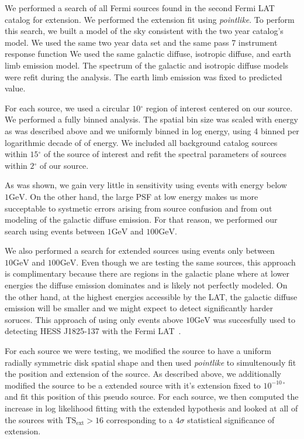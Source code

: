 \documentclass[preprint]{aastex}
\newcommand{\gev}{\text{GeV}\xspace}
\newcommand{\tsext}{\ensuremath{\text{TS}_\text{ext}}\xspace}
\renewcommand{\deg}{\ensuremath{^\circ}\xspace}
\newcommand{\pointlike}{{\em pointlike}\xspace}
\begin{document}
We performed a search of all Fermi sources found in the second Fermi LAT
catalog for extension.  We performed the extension fit using \pointlike.
To perform this search, we built a model of the sky consistent with
the two year catalog's model.   We used the same two year data set and
the same pass 7 instrument response function We used the same galactic
diffuse, isotropic diffuse, and earth limb emission model. The spectrum
of the galactic and isotropic diffuse models were refit during the
analysis. The earth limb emission was fixed to predicted value.

For each source, we used a circular $10\deg$ region of interest centered
on our source. We performed a fully binned analysis.  The spatial bin
size was scaled with energy as was described above and we uniformly
binned in log energy, using 4 binned per logarithmic decade of of energy.
We included all background catalog sources within $15\deg$ of the source
of interest and refit the spectral parameters of sources within $2\deg$
of our source.

As was shown, we gain very little in sensitivity using events with energy
below $1\gev$. On the other hand, the large PSF at low energy makes us
more succeptable to systmetic errors arising from source confusion and
from out modeling of the galactic diffuse emission.  For that reason,
we performed our search using events between $1\gev$ and $100\gev$.

We also performed a search for extended sources using events only between
$10\gev$ and $100\gev$. Even though we are testing the same sources,
this approach is complimentary because there are regions in the galactic
plane where at lower energies the diffuse emission dominates and is
likely not perfectly modeled. On the other hand, at the highest energies
accessible by the LAT, the galactic diffuse emission will be smaller and
we might expect to detect significantly harder soruces. This approach
of using only events above $10\gev$ was succesfully used to detecting
HESS J1825-137 with the Fermi LAT~\cite{HESS J1825 paper}.

For each source we were testing, we modified the source to have a
uniform radially symmetric disk spatial shape and then used \pointlike to
simultenously fit the position and extension of the source. As described
above, we additionally modified the source to be a extended source with
it's extension fixed to $10^{-10\circ}$ and fit this position of this
pseudo source. For each source, we then computed the increase in log
likelihood fitting with the extended hypothesis and looked at all of
the sources with $\tsext>16$ corresponding to a $4\sigma$ statistical
significance of extension.
\end{document}
